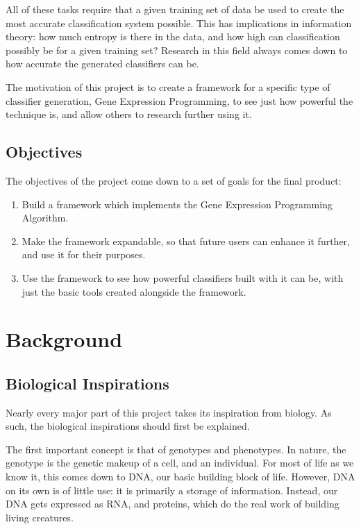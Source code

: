 \documentclass[a4paper,11pt]{report}
\begin{document}
All of these tasks require that a given 
training set of data be used to create the most accurate classification system possible. 
This has implications in information theory: how much entropy is there in the data, and 
how high can classification possibly be for a given training set? Research in this field 
always comes down to how accurate the generated classifiers can be. 

The motivation of this project is to create a framework for a specific type of classifier
generation, Gene Expression Programming, to see just how powerful the technique is, and 
allow others to research further using it.

\section{Objectives}

The objectives of the project come down to a set of goals for the final product:

\begin{enumerate}
 \item Build a framework which implements the Gene Expression Programming Algorithm.
 \item Make the framework expandable, so that future users can enhance it further, and use it for their purposes. 
 \item Use the framework to see how powerful classifiers built with it can be, with just the basic tools created
alongside the framework. 
\end{enumerate}

\chapter{Background}

\section{Biological Inspirations}

Nearly every major part of this project takes its inspiration from biology. As such, the biological inspirations 
should first be explained. 

The first important concept is that of genotypes and phenotypes. In nature, the genotype is the genetic makeup 
of a cell, and an individual. For most of life as we know it, this comes down to DNA, our basic building block 
of life. However, DNA on its own is of little use: it is primarily a storage of information. 
Instead, our DNA gets expressed as RNA, and proteins, which do the real work of building living creatures. 
\end{document}
